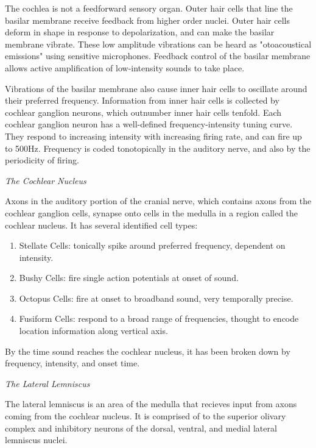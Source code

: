 \documentclass[12pt,article,oneside]{memoir}
\begin{document}
The cochlea is not a feedforward sensory organ. Outer hair cells that line the basilar
membrane receive feedback from higher order nuclei. Outer hair cells deform in shape
in response to depolarization, and can make the basilar membrane vibrate. These low
amplitude vibrations can be heard as "otoacoustical emissions" using sensitive microphones.
Feedback control of the basilar membrane allows active amplification of low-intensity sounds to
take place.

Vibrations of the basilar membrane also cause inner hair cells to oscillate around
their preferred frequency. Information from inner hair cells is collected by cochlear
ganglion neurons, which outnumber inner hair cells tenfold. Each cochlear ganglion neuron
has a well-defined frequency-intensity tuning curve. They respond to increasing intensity
with increasing firing rate, and can fire up to 500Hz. Frequency is coded tonotopically
in the auditory nerve, and also by the periodicity of firing. 

\bigskip
\noindent \textit{The Cochlear Nucleus}

Axons in the auditory portion of the cranial nerve, which contains axons from the cochlear
ganglion cells, synapse onto cells in the medulla in a region called the
cochlear nucleus. It has several identified cell types:

\begin{enumerate}

\item
Stellate Cells: tonically spike around preferred frequency, dependent on intensity.

\item
Bushy Cells: fire single action potentials at onset of sound.

\item
Octopus Cells: fire at onset to broadband sound, very temporally precise.

\item
Fusiform Cells: respond to a broad range of frequencies, thought to encode
location information along vertical axis.

\end{enumerate}

By the time sound reaches the cochlear nucleus, it has been broken down by
frequency, intensity, and onset time.

\bigskip
\noindent \textit{The Lateral Lemniscus}

The lateral lemniscus is an area of the medulla that recieves input from axons
coming from the cochlear nucleus. It is comprised of to the superior olivary
complex and inhibitory neurons of the dorsal, ventral, and medial lateral lemniscus
nuclei.
\end{document}
